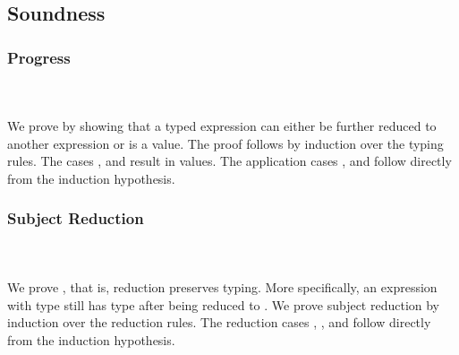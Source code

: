 \subsection{Soundness}

\subsubsection{Progress}\hfill\\\\
We prove  by showing that a typed expression  can either be further reduced to another expression  or  is a value. 
The proof follows by induction over the typing rules. 
\FProgress
The cases ,  and  result in values. 
The application cases ,  and  follow directly from the induction hypothesis. 
\subsubsection{Subject Reduction}\hfill\\\\
We prove , that is, reduction preserves typing. 
More specifically, an expression  with type  still has type  after being reduced to . 
We prove subject reduction by induction over the reduction rules. 
\FSubjectReduction
The  reduction cases , ,  and  follow directly from the induction hypothesis. 

